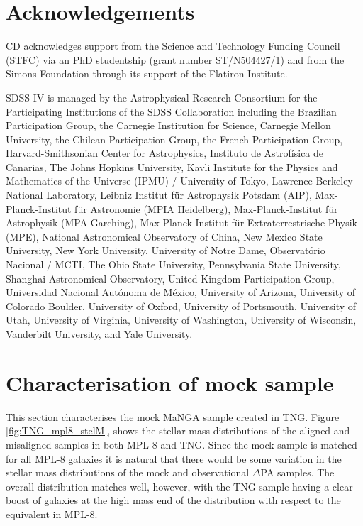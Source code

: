 \documentclass[fleqn,usenatbib]{mnras}
\begin{document}

\section*{Acknowledgements}
CD acknowledges support from the Science and Technology Funding Council (STFC) via an PhD studentship (grant number ST/N504427/1) and from the Simons Foundation through its support of the Flatiron Institute. 

SDSS-IV is managed by the Astrophysical Research Consortium for the Participating Institutions of the SDSS Collaboration including the Brazilian Participation Group, the Carnegie Institution for Science, Carnegie Mellon University, the Chilean Participation Group, the French Participation Group, Harvard-Smithsonian Center for Astrophysics, Instituto de Astrof\'isica de Canarias, The Johns Hopkins University, Kavli Institute for the Physics and Mathematics of the Universe (IPMU) / University of Tokyo, Lawrence Berkeley National Laboratory, Leibniz Institut f\"ur Astrophysik Potsdam (AIP), Max-Planck-Institut f\"ur Astronomie (MPIA Heidelberg), Max-Planck-Institut f\"ur Astrophysik (MPA Garching), Max-Planck-Institut f\"ur Extraterrestrische Physik (MPE), National Astronomical Observatory of China, New Mexico State University, New York University, University of Notre Dame, Observat\'orio Nacional / MCTI, The Ohio State University, Pennsylvania State University, Shanghai Astronomical Observatory, United Kingdom Participation Group, Universidad Nacional Aut\'onoma de M\'exico, University of Arizona, University of Colorado Boulder, University of Oxford, University of Portsmouth, University of Utah, University of Virginia, University of Washington, University of Wisconsin, Vanderbilt University, and Yale University.
\appendix

\section{Characterisation of mock sample} \label{sec:mock_appendix}
This section characterises the mock MaNGA sample created in TNG. Figure \ref{fig:TNG_mpl8_stelM}, shows the stellar mass distributions of the aligned and misaligned samples in both MPL-8 and TNG. Since the mock sample is matched for all MPL-8 galaxies it is natural that there would be some variation in the stellar mass distributions of the mock and observational $\Delta$PA samples. The overall distribution matches well, however, with the TNG sample having a clear boost of galaxies at the high mass end of the distribution with respect to the equivalent in MPL-8.
\end{document}
